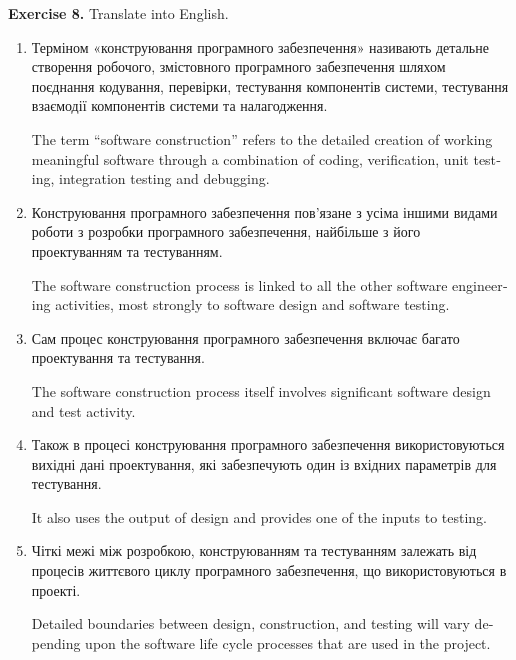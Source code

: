 \documentclass[a4paper,oneside,12pt,DIV=9]{scrartcl}
\begin{document}
	\textbf{Exercise 8.} Translate into English.
	\begin{enumerate}
		\item Терміном «конструювання програмного забезпечення» називають детальне створення робочого, змістовного програмного забезпечення шляхом поєднання кодування, перевірки, тестування компонентів системи, тестування взаємодії компонентів системи та налагодження.
		
		\begin{english}
			The term “software construction” refers to the detailed creation of working meaningful software through a combination of coding, verification, unit testing, integration testing and debugging.
		\end{english}
		
		\item Конструювання програмного забезпечення пов'язане з усіма іншими видами роботи з розробки програмного забезпечення, найбільше з його проектуванням та тестуванням.
		
		\begin{english}
			The software construction process is linked to all the other software engineering activities, most strongly to software design and software testing.
		\end{english}
		
		\item Сам процес конструювання програмного забезпечення включає багато проектування та тестування.
		
		\begin{english}
			The software construction process itself involves significant software design and test activity. 
		\end{english}
		
		\item Також в процесі конструювання програмного забезпечення використовуються вихідні дані проектування, які забезпечують один із вхідних параметрів для тестування.
		
		\begin{english}
			It also uses the output of design and provides one of the inputs to testing.
		\end{english}
		\item Чіткі межі між розробкою, конструюванням та тестуванням залежать від процесів життєвого циклу програмного забезпечення, що використовуються в проекті.
		
		\begin{english}
			Detailed boundaries between design, construction, and testing will vary depending upon the software life cycle processes that are used in the project.
		\end{english}
		

\end{enumerate}
\end{document}
